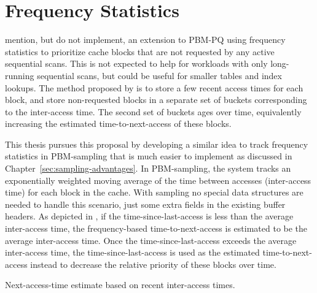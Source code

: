 \section{\label{sec:frequency-stats}Frequency Statistics}

\citet{pbm} mention, but do not implement, an extension to PBM-PQ using frequency statistics to prioritize cache blocks that are not requested by any active sequential scans. This is not expected to help for workloads with only long-running sequential scans, but could be useful for smaller tables and index lookups. The method proposed by \citet{pbm} is to store a few recent access times for each block, and store non-requested blocks in a separate set of buckets corresponding to the inter-access time. The second set of buckets ages over time, equivalently increasing the estimated time-to-next-access of these blocks.

This thesis pursues this proposal by developing a similar idea to track frequency statistics in PBM-sampling that is much easier to implement as discussed in Chapter~\ref{sec:sampling-advantages}. In PBM-sampling, the system tracks an exponentially weighted moving average of the time between accesses (inter-access time) for each block in the cache. With sampling no special data structures are needed to handle this scenario, just some extra fields in the existing buffer headers. As depicted in , if the time-since-last-access is less than the average inter-access time, the frequency-based time-to-next-access is estimated to be the average inter-access time. Once the time-since-last-access exceeds the average inter-access time, the time-since-last-access is used as the estimated time-to-next-access instead to decrease the relative priority of these blocks over time. 

\begin{algorithm}[]
\SetAlgoLined
\SetNoFillComment
\DontPrintSemicolon
{}

\;

\caption{Next-access-time estimate based on recent inter-access times.}
\label{alg:sampling_freq}

\end{algorithm}

